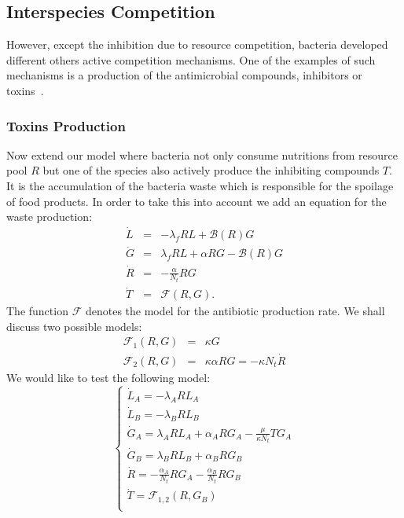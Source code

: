 \documentclass[10pt,A4paper]{article}
\begin{document}

\subsection{Interspecies Competition}

However, except the inhibition due to resource competition, bacteria developed different others active competition mechanisms.
One of the examples of such mechanisms is a production of the antimicrobial compounds, inhibitors or toxins~\cite{wloch-salamon_effect_2008, chao_structured_1981}.

\subsubsection{Toxins Production}
Now extend our model where bacteria not only consume nutritions from resource pool $R$ but one of the species also actively produce the inhibiting compounds $T$. 
It is the accumulation of the bacteria waste which is responsible for the spoilage of food products. 
In order to take this into account we add an equation for the waste production:
\begin{eqnarray}
\dot{L} &=& - \lambda_f R L + \mathcal{B}(R)G\\
\dot{G} &=& \lambda_f R L +\alpha R G-\mathcal{B}(R)G\\
\dot{R} &=&-\frac{\alpha}{N_t} R G\\
\dot{T} &=& \mathcal{F}(R,G).
\end{eqnarray}
The function $\mathcal{F}$ denotes the model for the antibiotic production rate. 
We shall discuss two possible models:
\begin{eqnarray}
\mathcal{F}_1(R,G)&=&\kappa G\\
\mathcal{F}_2(R,G)&=&\kappa\alpha R G=-\kappa N_t\dot{R}
\end{eqnarray}
We would like to test the following model:
\begin{equation}
    \begin{cases}
        \dot{L}_A = - \lambda_A R L_A\\
        \dot{L}_B = - \lambda_B R L_B \\
        \dot{G}_A = \lambda_A R L_A + \alpha_A R G_A - \frac{\mu}{\kappa N_t} T G_A\\
        \dot{G}_B = \lambda_B R L_B + \alpha_B R G_B\\
        \dot{R} = -\frac{\alpha_A}{N_t} R G_A-\frac{\alpha_B}{N_t} R G_B\\
        \dot{T} = \mathcal{F}_{1,2} (R, G_B) \\
    \end{cases}
    \label{eq:model_2sp_toxin}
\end{equation}
\end{document}
